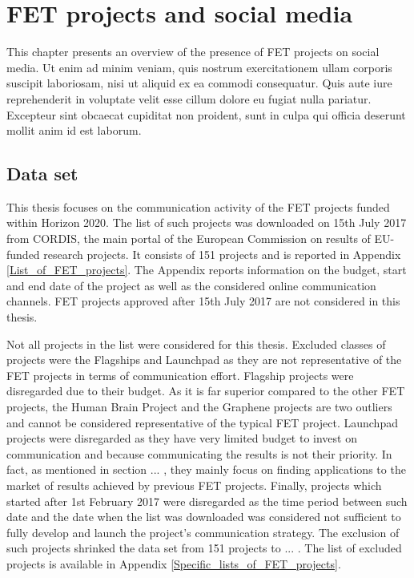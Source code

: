 \chapter{FET projects and social media}
This chapter presents an overview of the presence of FET projects on social media. Ut enim ad minim veniam, quis nostrum exercitationem ullam corporis suscipit laboriosam, nisi ut aliquid ex ea commodi consequatur. Quis aute iure reprehenderit in voluptate velit esse cillum dolore eu fugiat nulla pariatur. Excepteur sint obcaecat cupiditat non proident, sunt in culpa qui officia deserunt mollit anim id est laborum.

\section{Data set}
This thesis focuses on the communication activity of the FET projects funded within Horizon 2020. The list of such projects was downloaded on 15th July 2017 from CORDIS, the main portal of the European Commission on results of EU-funded research projects. It consists of 151 projects and is reported in Appendix \ref{List_of_FET_projects}. The Appendix reports information on the budget, start and end date of the project as well as the considered online communication channels. FET projects approved after 15th July 2017 are not considered in this thesis.  

Not all projects in the list were considered for this thesis. Excluded classes of projects were the Flagships and Launchpad as they are not representative of the FET projects in terms of communication effort. Flagship projects were disregarded due to their budget. As it is far superior compared to the other FET projects, the Human Brain Project and the Graphene projects are two outliers and cannot be considered representative of the typical FET project. Launchpad projects were disregarded as they have very limited budget to invest on communication and because communicating the results is not their priority. In fact, as mentioned in section ... , they mainly focus on finding applications to the market of results achieved by previous FET projects. Finally, projects which started after 1st February 2017 were disregarded as the time period between such date and the date when the list was downloaded was considered not sufficient to fully develop and launch the project's communication strategy. The exclusion of such projects shrinked the data set from 151 projects to ... . The list of excluded projects is available in Appendix \ref{Specific_lists_of_FET_projects}.

